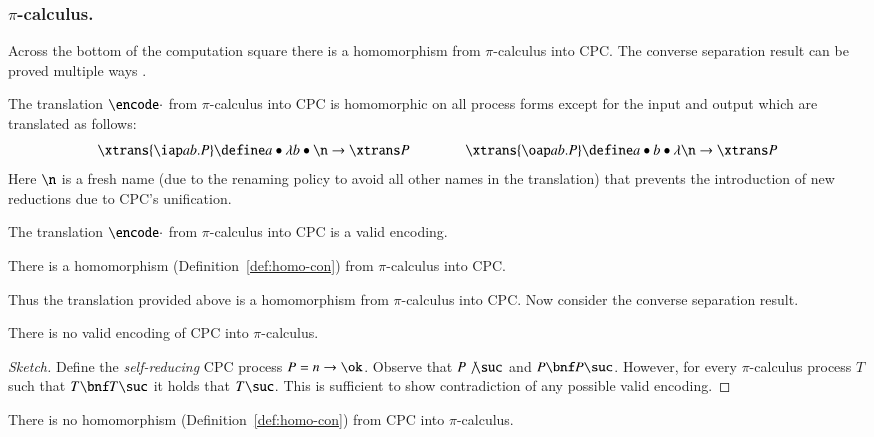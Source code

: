 \documentclass{llncs}
\begin{document}
\subsubsection*{$\pi$-calculus.}
\label{subsec:pi}


Across the bottom of the computation square there is a homomorphism from $\pi$-calculus into CPC.
The converse separation result can be proved multiple ways \cite{GivenWilsonGorlaJay10,GivenWilsonPHD,givenwilson:hal-00987578}.


The translation $\encode \cdot$ from $\pi$-calculus into CPC is homomorphic on all process forms except for the input and output which are translated as follows:
\begin{equation*}
\xtrans {\iap a b .P} \define a \bullet \lambda b\bullet \n \to \xtrans P\qquad\qquad
\xtrans {\oap a b .P} \define a\bullet b\bullet \lambda \n\to \xtrans P
\end{equation*}
Here $\n$ is a fresh name (due to the renaming policy to avoid all other
names in the translation) that prevents the introduction of new reductions due to CPC's unification.

\begin{lemma}
\label{lem:pi2cpc-valid}
The translation $\encode\cdot$ from $\pi$-calculus into CPC is a valid encoding.
\end{lemma}

\begin{theorem}
\label{thm:pi2cpc-hom}
There is a homomorphism (Definition~\ref{def:homo-con}) from $\pi$-calculus into CPC.
\end{theorem}

Thus the translation provided above is a homomorphism from $\pi$-calculus into CPC.
Now consider the converse separation result.

\begin{lemma}
\label{lem:nocpc2pi-1}
There is no valid encoding of CPC into $\pi$-calculus.
\end{lemma}
\begin{proof}[Sketch]
Define the {\em self-reducing} CPC process $P=n\to \ok$.
Observe that $P\not\suc$ and $P\bnf P\suc$.
However, for every $\pi$-calculus process $T$ such that $T\bnf T\suc$ it holds that $T\suc$.
This is sufficient to show contradiction of any possible valid encoding.
\end{proof}

\begin{theorem}
\label{thm:noCPC2pi}
There is no homomorphism (Definition~\ref{def:homo-con}) from CPC into $\pi$-calculus.
\end{theorem}
\end{document}
